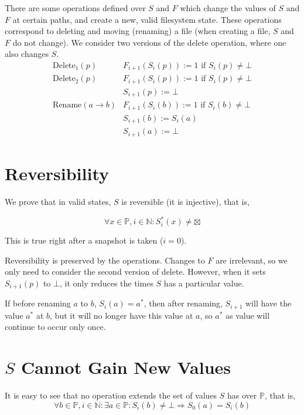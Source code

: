 \documentclass[12pt]{article}
\newcommand{\bxt}{\boxtimes}
\newcommand{\setp}{\mathbb{P}}
\newcommand{\setn}{\mathbb{N}}
\begin{document}
There are some operations defined over $S$ and $F$ which change the values
of $S$ and $F$ at certain paths,
and create a new, valid filesystem state.
These operations correspond to deleting and
moving (renaming) a file (when creating a file, $S$ and $F$ do not change).
We
consider two versions of the delete operation, where one also changes $S$.
$$
\begin{array}{ll}
\mbox{Delete}_1(p) & F_{i+1}(S_{i}(p)):=1 \mbox{ if } S_i(p)\neq\bot \\
\hline
\mbox{Delete}_2(p) & F_{i+1}(S_{i}(p)):=1 \mbox{ if } S_i(p)\neq\bot \\
   & S_{i+1}(p):=\bot \\
\hline
\mbox{Rename}(a \rightarrow b) & F_{i+1}(S_{i}(b)):=1 \mbox{ if } S_i(b)\neq\bot \\
   & S_{i+1}(b):=S_i(a) \\
   & S_{i+1}(a):=\bot
\end{array}
$$

\section{Reversibility}

We prove that in valid states, $S$ is reversible (it is injective), that is,

\begin{equation}
\forall x\in\setp,i\in\setn:
S^*_i(x)\neq\bxt
\end{equation}

This is true right after a snapshot is taken ($i=0$).

Reversibility is preserved by the operations.
Changes to $F$ are irrelevant, so we only need to consider the second version
of delete. However, when it sets $S_{i+1}(p)$ to
$\bot$, it only reduces the times $S$ has a particular value.

If before renaming $a$ to $b$, $S_i(a)=a^*$, then after renaming, $S_{i+1}$ will have the value
$a^*$ at $b$, but it will no longer have this value at $a$, so $a^*$ as
value will continue to occur only once.

\section{$S$ Cannot Gain New Values}

It is easy to see that no operation extends the set of values $S$ has over $\setp$, that is,
\begin{equation}
\forall b\in\setp, i\in\setn: \exists a\in\setp:
S_i(b)\neq\bot \Rightarrow S_0(a) = S_i(b)
\end{equation}
\end{document}
